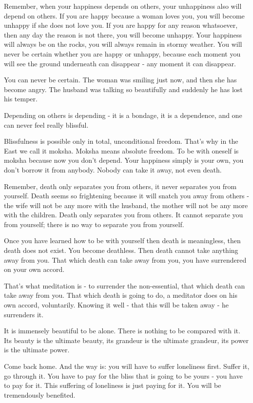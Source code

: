Remember, when your happiness depends on others, your unhappiness also will depend on others. If you are happy because a woman loves you, you will become unhappy if she does not love you. If you are happy for any reason whatsoever, then any day the reason is not there, you will become unhappy. Your happiness will always be on the rocks, you will always remain in stormy weather. You will never be certain whether you are happy or unhappy, because each moment you will see the ground underneath can disappear - any moment it can disappear. 

You can never be certain. The woman was smiling just now, and then she has become angry. The husband was talking so beautifully and suddenly he has lost his temper. 

Depending on others is depending - it is a bondage, it is a dependence, and one can never feel really blissful. 

Blissfulness is possible only in total, unconditional freedom. That's why in the East we call it moksha. Moksha means absolute freedom. To be with oneself is moksha because now you don't depend. Your happiness simply is your own, you don't borrow it from anybody. Nobody can take it away, not even death. 

Remember, death only separates you from others, it never separates you from yourself. Death seems so frightening because it will snatch you away from others - the wife will not be any more with the husband, the mother will not be any more with the children. Death only separates you from others. It cannot separate you from yourself; there is no way to separate you from yourself. 

Once you have learned how to be with yourself then death is meaningless, then death does not exist. You become deathless. Then death cannot take anything away from you. That which death can take away from you, you have surrendered on your own accord. 

That's what meditation is - to surrender the non-essential, that which death can take away from you. That which death is going to do, a meditator does on his own accord, voluntarily. Knowing it well - that this will be taken away - he surrenders it. 

It is immensely beautiful to be alone. There is nothing to be compared with it. Its beauty is the ultimate beauty, its grandeur is the ultimate grandeur, its power is the ultimate power. 

Come back home. And the way is: you will have to suffer loneliness first. Suffer it, go through it. You have to pay for the bliss that is going to be yours - you have to pay for it. This suffering of loneliness is just paying for it. You will be tremendously benefited. 